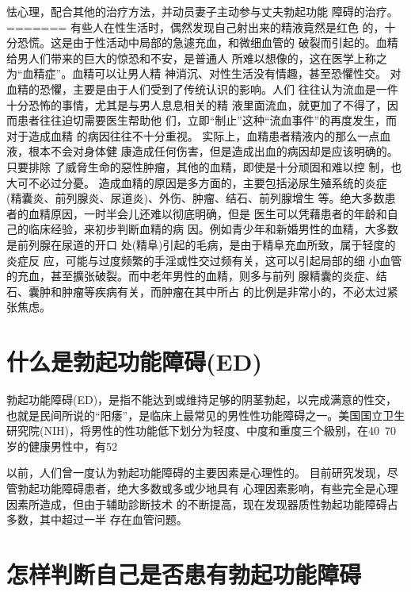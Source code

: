 \documentclass[12pt,UTF8]{ctexbook}
\begin{document}
怯心理，配合其他的治疗方法，并动员妻子主动参与丈夫勃起功能
障碍的治疗。
=======
有些人在性生活时，偶然发现自己射出来的精液竟然是红色
的，十分恐慌。这是由于性活动中局部的急遽充血，和微细血管的
破裂而引起的。血精给男人们带来的巨大的惊恐和不安，是普通人
所难以想像的，这在医学上称之为“血精症”。血精可以让男人精
神消沉、对性生活没有情趣，甚至恐懼性交。
对血精的恐懼，主要是由于人们受到了传统认识的影响。人们
往往认为流血是一件十分恐怖的事情，尤其是与男人息息相关的精
液里面流血，就更加了不得了，因而患者往往迫切需要医生帮助他
们，立即“制止”这种“流血事件”的再度发生，而对于造成血精
的病因往往不十分重视。
实际上，血精患者精液内的那么一点血液，根本不会对身体健
康造成任何伤害，但是造成出血的病因却是应该明确的。只要排除
了威脅生命的惡性肿瘤，其他的血精，即使是十分顽固和难以控
制，也大可不必过分憂。
造成血精的原因是多方面的，主要包括泌尿生殖系统的炎症
(精囊炎、前列腺炎、尿道炎)、外伤、肿瘤、结石、前列腺增生
等。绝大多数患者的血精原因，一时半会儿还难以彻底明确，但是
医生可以凭藉患者的年龄和自己的临床经验，来初步判断血精的病
因。例如青少年和新婚男性的血精，大多数是前列腺在尿道的开口
处(精阜)引起的毛病，是由于精阜充血所致，属于轻度的炎症反
应，可能与过度频繁的手淫或性交过频有关，这可以引起局部的细
小血管的充血，甚至擴张破裂。而中老年男性的血精，则多与前列
腺精囊的炎症、结石、囊肿和肿瘤等疾病有关，而肿瘤在其中所占
的比例是非常小的，不必太过紧张焦虑。

\section{什么是勃起功能障碍(ED)}

勃起功能障碍(ED)，是指不能达到或维持足够的阴茎勃起，以完成满意的性交，也就是民间所说的“阳痿”，是临床上最常见的男性性功能障碍之一。美国国立卫生研究院(NIH)，将男性的性功能低下划分为轻度、中度和重度三个級别，在40~70岁的健康男性中，有52%

以前，人们曾一度认为勃起功能障碍的主要因素是心理性的。
目前研究发现，尽管勃起功能障碍患者，绝大多数或多或少地具有
心理因素影响，有些完全是心理因素所造成，但由于辅助診断技术
的不断提高，现在发现器质性勃起功能障碍占多数，其中超过一半
存在血管问题。

\section{怎样判断自己是否患有勃起功能障碍}
\end{document}
